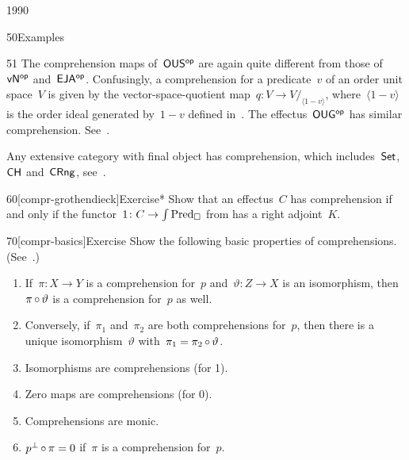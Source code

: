 \begin{parsec}{1990}
\begin{point}{50}{Examples}
\begin{point}{51}
The comprehension maps of~${\mathsf{OUS}}{^{\mathsf{op}}}$ are again quite different
    from those of~${\mathsf{vN}}{^{\mathsf{op}}}$ and~${\mathsf{EJA}}{^{\mathsf{op}}}$.
Confusingly, a comprehension for a predicate~$v$
    of an order unit space~$V$
    is given by the vector-space-quotient
    map~$q\colon V \to V/_{\langle1-v\rangle}$,
    where~$\langle 1-v \rangle$ is the order ideal generated
    by~$1-v$ defined in~.
The effectus~${\mathsf{OUG}}{^{\mathsf{op}}}$ has similar comprehension.
    See~\cite{effintro}.

Any extensive category with final object has comprehension,
    which includes~$\mathsf{Set}$, $\mathsf{CH}$ and~$\mathsf{CRng}$,
    see~\cite{effintro}.
\end{point}
\end{point}
\begin{point}{60}[compr-grothendieck]{Exercise*}%
    Show that an effectus~$C$ has comprehension if and only
        if the functor~$1 \colon C \to \int \operatorname{Pred}_\square$
        from 
        has a right adjoint~$K$.
\end{point}
\begin{point}{70}[compr-basics]{Exercise}%
Show the following basic properties of comprehensions.
    (See~\cite{effintro}.)
\begin{enumerate}
    \item If~$\pi\colon X \to Y$ is a comprehension for~$p$
                and~$\vartheta\colon Z \to X$ is an isomorphism,
                then~$\pi \mathop{\circ} \vartheta$ is a comprehension for~$p$
                as well.
    \item Conversely, if~$\pi_1$ and~$\pi_2$
            are both comprehensions for~$p$,
            then there is a unique isomorphism~$\vartheta$
            with~$\pi_1 = \pi_2 \mathop{\circ} \vartheta$.
    \item Isomorphisms are comprehensions (for 1).
    \item Zero maps are comprehensions (for 0).
    \item Comprehensions are monic.
    \item $p^\perp \mathop{\circ} \pi = 0$ if~$\pi$ is a comprehension for~$p$.
\end{enumerate}
\end{point}
\end{parsec}
\spacingfix{}

